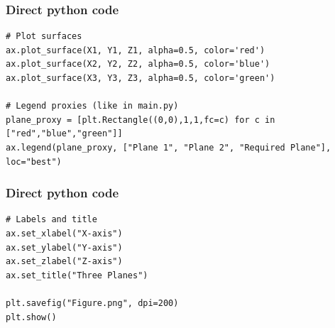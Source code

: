 \documentclass{beamer}
\begin{document}
\begin{frame}[fragile]
\frametitle{Direct python code}
\begin{lstlisting}
# Plot surfaces
ax.plot_surface(X1, Y1, Z1, alpha=0.5, color='red')
ax.plot_surface(X2, Y2, Z2, alpha=0.5, color='blue')
ax.plot_surface(X3, Y3, Z3, alpha=0.5, color='green')

# Legend proxies (like in main.py)
plane_proxy = [plt.Rectangle((0,0),1,1,fc=c) for c in ["red","blue","green"]]
ax.legend(plane_proxy, ["Plane 1", "Plane 2", "Required Plane"], loc="best")
\end{lstlisting}
\end{frame}
\begin{frame}[fragile]
\frametitle{Direct python code}
\begin{lstlisting}
# Labels and title
ax.set_xlabel("X-axis")
ax.set_ylabel("Y-axis")
ax.set_zlabel("Z-axis")
ax.set_title("Three Planes")

plt.savefig("Figure.png", dpi=200)
plt.show()


\end{lstlisting}
\end{frame}
\end{document}
